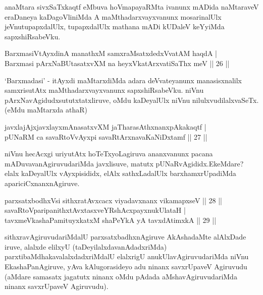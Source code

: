 \begin{artha}
anaMtara sivxSaTxkaqtf eMbuva hoVmapayaRMta ivanunx mADida naMtaraveV eraDaneya kaDagoVliniMda A maMthadarxvayxvanunx mosarinalUlx jeVnutupapxdalUlx, tupapxdalUlx mathana mADi kUDaleV keYyiMda sapxshiRsabeVku.
\end{artha}


\begin{shl}
BarxmasiVtAyxdinA manathxM samxraMsatxdedxVvatAM haqdA | \\
Barxmasi pArxNaBUtasatxvXM na heyxVkatArxvatiSaThx meV \hfill|| 26 || 
\end{shl}

\begin{artha}
`Barxmadasi' - itAyxdi maMtarxdiMda adara deVvateyanunx manasisxnalilx samxrisutAtx maMthadarxvayxvanunx sapxshiRsabeVku. niVnu pArxNavAgidudx\break sututxtatxliruve, oMdu kaDeyalUlx niVnu nilulxvudilalxvaSeTx. (eMdu maMtarxda athaR)
\end{artha}


\begin{shl}
javxlajAjxjavxlayxmAnasatxvXM jaTharasAthxnanxpAkakaqtf | \\
pUNaRM ca savaRtoVvAyxpi savaRtArxnavaKaNiDxtamf \hfill|| 27 || 
\end{shl}

\begin{artha}
niVnu hecAcxgi uriyutAtx hoTeTxyoLagiruva ananxvanunx pacana mADuvavanAgiruvudariMda javxlisuve, matutx pUNaRvAgididx.\break EkeMdare? elalx kaDeyalUlx vAyxpisididx, elAlx sathxLadalUlx barxhamxrUpadiMda apariciCxnanxnAgiruve.
\end{artha}


\begin{shl}
parxsatxbodhxV\s si sithxratAvxcacx viyadavxnanx vikamapxseV \hfill|| 28 || \\
savaRtoV\s paripanithxtAvxtasxveYRshAcxpayxnukUlataH | \\
tavxmeVkashaPamituyxkatxM shaPeYkA yA tavxdAtimxkA \hfill|| 29 || 
\end{shl}

\begin{artha}
sithxravAgiruvudariMdalU parxsatxbadhxnAgiruve AkAshadaMte alAlxDade iruve, alalxde elilxyU (taDeyilalxdavanAdadxriMda) parxtibaMdhakavalalxdadxriMdalU elalxrigU anukUlavAgiruvudariMda niVnu EkashaPanAgiruve, yAva kAlugorasideyo adu ninanx savxrUpaveV Agiruvudu (aMdare samasatx jagatutx ninanx oMdu pAdada aMshavAgiruvudariMda ninanx savxrUpaveV Agiruvudu).
\end{artha}

